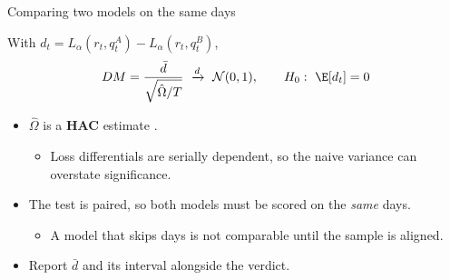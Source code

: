 \documentclass[9pt, aspectratio=169, t]{beamer}
\begin{document}
\begin{frame}{Comparing two models on the same days}
  \hypertarget{ap:dm}{}%
  \hfill\hyperlink{main:backtest}{}\par\vspace{-0.6em}
  \begin{defn}
    With $d_{t} = L_{\alpha}(r_{t}, q^{A}_{t}) - L_{\alpha}(r_{t}, q^{B}_{t})$,
    \vspace{-0.4em}
    \[ DM = \frac{\bar d}{\sqrt{\hat\Omega / T}} \ \xrightarrow{d}\ \mathcal{N}(0,1),
       \qquad H_{0}:\ \E[d_{t}] = 0 \]
    \vspace{-0.4em}
    \hfill{\scriptsize\parencite{diebold1995comparing}}
  \end{defn}
  \begin{itemize}
    \item $\hat\Omega$ is a \textbf{HAC} estimate \parencite{newey1987hac}.
      \begin{itemize}
        \item Loss differentials are serially dependent, so the naive variance can
              overstate significance.
      \end{itemize}
    \item The test is paired, so both models must be scored on the \emph{same} days.
      \begin{itemize}
        \item A model that skips days is not comparable until the sample is aligned.
      \end{itemize}
    \item Report $\bar d$ and its interval alongside the verdict.
  \end{itemize}
\end{frame}
\end{document}
